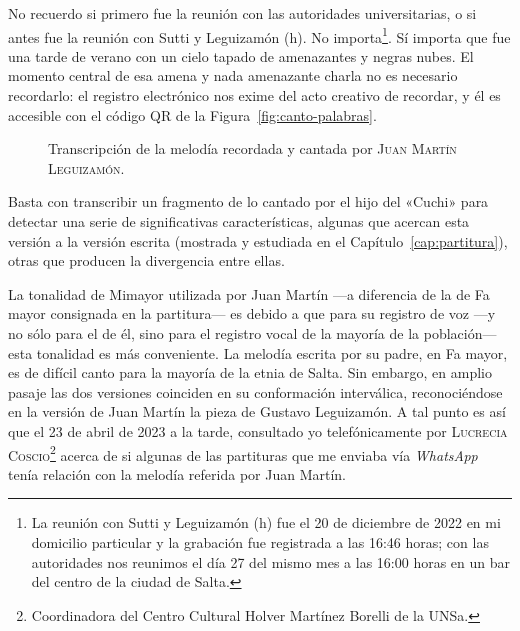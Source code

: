 No recuerdo si primero fue la reunión con las autoridades universitarias, o si antes fue la reunión con Sutti y Leguizamón (h). No importa\footnote{La reunión con Sutti y Leguizamón (h) fue el 20 de diciembre de 2022 en mi domicilio particular y la grabación fue registrada a las 16:46 horas; con las autoridades nos reunimos el día 27 del mismo mes a las 16:00 horas en un bar del centro de la ciudad de Salta.}. Sí importa que fue una tarde de verano con un cielo tapado de amenazantes y negras nubes. El momento central de esa amena y nada amenazante charla no es necesario recordarlo: el registro electrónico nos exime del acto creativo de recordar, y él es accesible con el código QR de la Figura~\ref{fig:canto-palabras}.

\begin{figure}[htb]
\caption[Transcripción de un fragmento de la melodía recordada.]{Transcripción de la melodía recordada y cantada por \textsc{Juan Martín Leguizamón.}}
\label{fig:Transcripcion}
\end{figure}

Basta con transcribir un fragmento de lo cantado por el hijo del «Cuchi» para detectar una serie de significativas características, algunas que acercan esta versión a la versión escrita (mostrada y estudiada en el Capítulo~\ref{cap:partitura}), otras que producen la divergencia entre ellas.

La tonalidad de Mi\bemoltxt mayor utilizada por Juan Martín ---a diferencia de la de Fa mayor consignada en la partitura--- es debido a que para su registro de voz ---y no sólo para el de él, sino para el registro vocal de la mayoría de la población--- esta tonalidad es más conveniente. La melodía escrita por su padre, en Fa mayor, es de difícil canto para la mayoría de la etnia de Salta. Sin embargo, en amplio pasaje las dos versiones coinciden en su conformación interválica, reconociéndose en la versión de Juan Martín la pieza de Gustavo Leguizamón. A tal punto es así que el 23 de abril de 2023 a la tarde, consultado yo telefónicamente por \textsc{Lucrecia Coscio}\footnote{Coordinadora del Centro Cultural Holver Martínez Borelli de la UNSa.} acerca de si algunas de las partituras que me enviaba vía \emph{WhatsApp} tenía relación con la melodía referida por Juan Martín.

